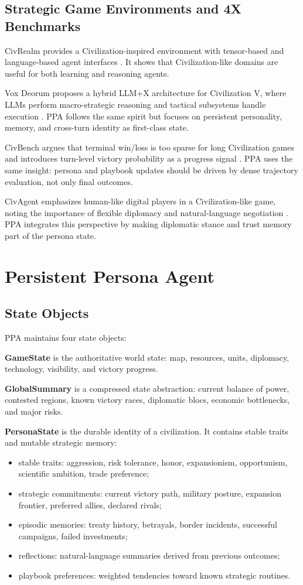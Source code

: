 \documentclass[10pt,twocolumn]{article}
\begin{document}
\subsection{Strategic Game Environments and 4X Benchmarks}
CivRealm provides a Civilization-inspired environment with tensor-based and language-based agent interfaces \cite{qi2024civrealm}. It shows that Civilization-like domains are useful for both learning and reasoning agents.

Vox Deorum proposes a hybrid LLM+X architecture for Civilization V, where LLMs perform macro-strategic reasoning and tactical subsystems handle execution \cite{chen2025vox}. PPA follows the same spirit but focuses on persistent personality, memory, and cross-turn identity as first-class state.

CivBench argues that terminal win/loss is too sparse for long Civilization games and introduces turn-level victory probability as a progress signal \cite{chen2026civbench}. PPA uses the same insight: persona and playbook updates should be driven by dense trajectory evaluation, not only final outcomes.

CivAgent emphasizes human-like digital players in a Civilization-like game, noting the importance of flexible diplomacy and natural-language negotiation \cite{fuxi2025civagent}. PPA integrates this perspective by making diplomatic stance and trust memory part of the persona state.

\section{Persistent Persona Agent}
\subsection{State Objects}
PPA maintains four state objects:

\textbf{GameState} is the authoritative world state: map, resources, units, diplomacy, technology, visibility, and victory progress.

\textbf{GlobalSummary} is a compressed state abstraction: current balance of power, contested regions, known victory races, diplomatic blocs, economic bottlenecks, and major risks.

\textbf{PersonaState} is the durable identity of a civilization. It contains stable traits and mutable strategic memory:
\begin{itemize}
  \item stable traits: aggression, risk tolerance, honor, expansionism, opportunism, scientific ambition, trade preference;
  \item strategic commitments: current victory path, military posture, expansion frontier, preferred allies, declared rivals;
  \item episodic memories: treaty history, betrayals, border incidents, successful campaigns, failed investments;
  \item reflections: natural-language summaries derived from previous outcomes;
  \item playbook preferences: weighted tendencies toward known strategic routines.
\end{itemize}
\end{document}
